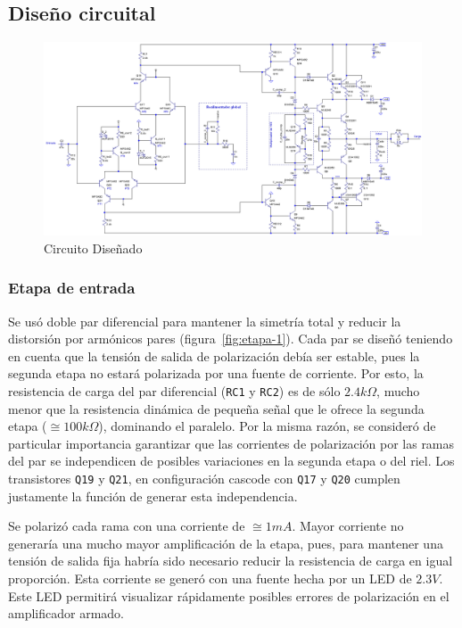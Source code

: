 \documentclass[a4paper,12pt,twoside]{article}
\begin{document}
\newpage


\subsection{Diseño circuital}


\begin{figure}[H]
\centering
\includegraphics[width=0.75\paperheight,angle=90,origin=c]{img/circuito}
\caption{Circuito Diseñado}
\label{fig:circuito} 
\end{figure}

\subsubsection{Etapa de entrada}



Se usó doble par diferencial para mantener la simetría total y reducir la distorsión por armónicos pares (figura~\ref{fig:etapa-1}). Cada par se diseñó teniendo en cuenta que la tensión de salida de polarización debía ser estable, pues la segunda etapa no estará polarizada por una fuente de corriente. Por esto, la resistencia de carga del par diferencial (\texttt{RC1} y \texttt{RC2}) es de sólo $2.4k\Omega$, mucho menor que la resistencia dinámica de pequeña señal que le ofrece la segunda etapa ($\cong 100k\Omega$), dominando el paralelo.
Por la misma razón, se consideró de particular importancia garantizar que las corrientes de polarización por las ramas del par se independicen de posibles variaciones en la segunda etapa o del riel. Los transistores \texttt{Q19} y \texttt{Q21}, en configuración cascode con \texttt{Q17} y \texttt{Q20} cumplen justamente la función de generar esta independencia.

Se polarizó cada rama con una corriente de $\cong 1mA$. Mayor corriente no generaría una mucho mayor amplificación de la etapa, pues, para mantener una tensión de salida fija habría sido necesario reducir la resistencia de carga en igual proporción. Esta corriente se generó con una fuente hecha por un LED de $2.3V$. Este LED permitirá visualizar rápidamente posibles errores de polarización en el amplificador armado.
\end{document}
